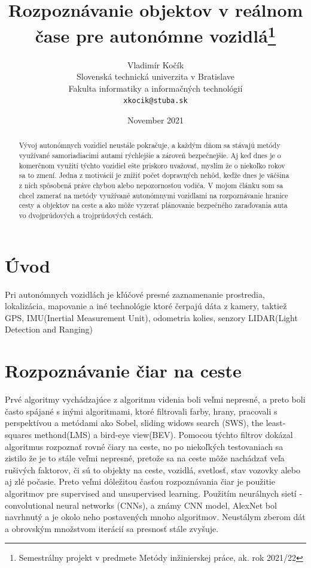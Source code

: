 \documentclass[10pt,twoside,slovak,a4paper]{article}
\title{Rozpoznávanie objektov v reálnom čase pre autonómne vozidlá\thanks{Semestrálny projekt v predmete Metódy inžinierskej práce, ak. rok 2021/22}}
\author{Vladimír Kočík\\[2pt]
	{\small Slovenská technická univerzita v Bratislave}\\
	{\small Fakulta informatiky a informačných technológií}\\
	{\small \texttt{xkocik@stuba.sk}}
	}
\date{November 2021}
\begin{document}
\maketitle
\begin{abstract}

Vývoj autonómnych vozidiel neustále pokračuje, a každým dňom sa stávajú metódy využívané samoriadiacimi autami rýchlejšie a zároveň bezpečnejšie. Aj keď dnes je o komerčnom využití týchto vozidiel ešte priskoro uvažovať, myslím že o niekoľko rokov sa to zmení. Jedna z motivácií je znížiť počet dopravných nehôd, keďže dnes je väčšina z nich spôsobená práve chybou alebo nepozornosťou vodiča. V mojom článku som sa chcel zamerať na metódy využívané autonómnymi vozidlami na rozpoznávanie hranice cesty a objektov na ceste a ako môže vyzerať plánovanie bezpečného zaraďovania auta vo dvojprúdových a trojprúdových cestách.


\end{abstract}

\section{Úvod} 

Pri autonómnych vozidlách je kľúčové presné zaznamenanie prostredia, lokalizácia, mapovanie a iné technológie ktoré čerpajú dáta z kamery, taktiež GPS, IMU(Inertial Measurement Unit), odometria kolies, senzory LIDAR(Light Detection and Ranging) 


\cite{6629552}

\section{Rozpoznávanie čiar na ceste}

Prvé algoritmy vychádzajúce z algoritmu videnia boli veľmi nepresné, a preto boli často spájané s inými algoritmami, ktoré filtrovali farby, hrany, pracovali s perspektívou a metódami ako Sobel, sliding widows search (SWS), the least-squares methond(LMS) a bird-eye view(BEV). Pomocou týchto filtrov dokázal algoritmus rozpoznať rovné čiary na ceste, no po niekoľkých testovaniach sa zistilo že je to stále veľmi nepresné, pretože sa na ceste môže nachádzať veľa rušivých faktorov, či sú to objekty na ceste, vozidlá, svetlosť, stav vozovky alebo aj zlé počasie. 
Preto veľmi dôležitou časťou rozpoznávania čiar je použitie algoritmov pre supervised and unsupervised learning. Použitím neurálnych sietí -convolutional neural networks (CNNs), a známy CNN model, AlexNet bol navrhnutý a je okolo neho postavených mnoho algoritmov. Neustálym zberom dát a obrovským množstvom iterácií sa presnosť stále zvyšuje.
\end{document}
